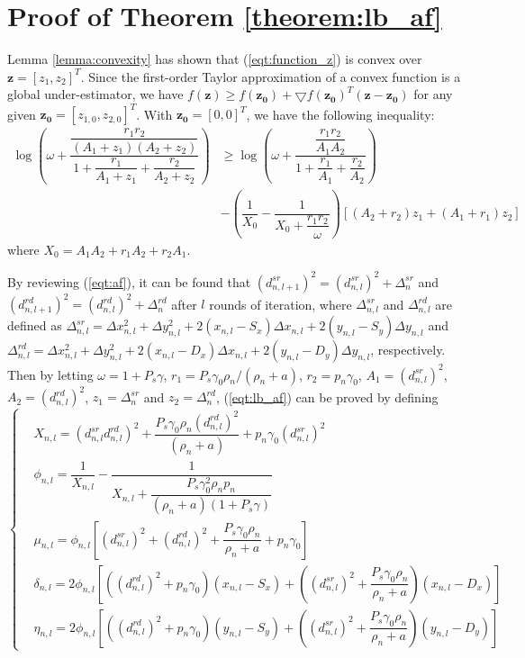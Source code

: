 \documentclass[12pt, draftclsnofoot, onecolumn]{IEEEtran}
\begin{document}
\section{Proof of Theorem \ref{theorem:lb_af}}\label{app:e}
Lemma \ref{lemma:convexity} has shown that (\ref{eqt:function_z}) is convex over $\bm{z}=[z_{1},z_{2}]^{T}$. Since the first-order Taylor approximation of a convex function is a global under-estimator\cite{Boyd:2004:CO:993483}, we have $f(\bm{z})\geq f(\bm{z}_{\bm{0}})+\bigtriangledown f(\bm{z}_{\bm{0}})^{T}(\bm{z}-\bm{z}_{\bm{0}})$ for any given $\bm{z}_{\bm{0}}=[z_{1,0},z_{2,0}]^{T}$. With $\bm{z}_{\bm{0}}=[0,0]^{T}$, we have the following inequality:
\begin{equation}
\begin{aligned}
\log(\omega +\dfrac{\dfrac{r_{1}r_{2}}{(A_{1}+z_{1})(A_{2}+z_{2})}}{1+\dfrac{r_{1}}{A_{1}+z_{1}}+\dfrac{r_{2}}{A_{2}+z_{2}}})&\geq \log(\omega +\dfrac{\dfrac{r_{1}r_{2}}{A_{1}A_{2}}}{1+\dfrac{r_{1}}{A_{1}}+\dfrac{r_{2}}{A_{2}}})\\
&-(\dfrac{1}{X_{0}}-\dfrac{1}{X_{0}+\dfrac{r_{1}r_{2}}{\omega}})[(A_{2}+r_{2})z_{1}+(A_{1}+r_{1})z_{2}]
\end{aligned}
\end{equation}
where $X_{0}=A_{1}A_{2}+r_{1}A_{2}+r_{2}A_{1}$.

By reviewing (\ref{eqt:af}), it can be found that $(d^{sr}_{n,l+1})^{2}=(d^{sr}_{n,l})^{2}+\Delta^{sr}_{n}$ and $(d^{rd}_{n,l+1})^{2}=(d^{rd}_{n,l})^{2}+\Delta^{rd}_{n}$ after $l$ rounds of iteration, where $\Delta^{sr}_{n,l}$ and $\Delta^{rd}_{n,l}$ are defined as $\Delta^{sr}_{n,l}=\Delta x_{n,l}^{2}+\Delta y_{n,l}^{2}+2(x_{n,l}-S_{x})\Delta x_{n,l}+2(y_{n,l}-S_{y})\Delta y_{n,l}$ and $\Delta^{rd}_{n,l}=\Delta x_{n,l}^{2}+\Delta y_{n,l}^{2}+2(x_{n,l}-D_{x})\Delta x_{n,l}+2(y_{n,l}-D_{y})\Delta y_{n,l}$, respectively. Then by letting $\omega=1+P_{s}\gamma$, $r_{1}=P_{s}\gamma_{0}\rho_{n}/(\rho_{n}+a)$, $r_{2}=p_{n}\gamma_{0}$, $A_{1}=(d^{sr}_{n,l})^{2}$, $A_{2}=(d^{rd}_{n,l})^{2}$, $z_{1}=\Delta^{sr}_{n}$ and $z_{2}=\Delta^{rd}_{n}$, (\ref{eqt:lb_af}) can be proved by defining
\begin{equation}\label{eqt:def}
\left\{
\begin{aligned}
&X_{n,l}=(d^{sr}_{n,l}d^{rd}_{n,l})^{2}+\dfrac{P_{s}\gamma_{0}\rho_{n}(d^{rd}_{n,l})^{2}}{(\rho_{n}+a)}+p_{n}\gamma_{0}(d^{sr}_{n,l})^{2}\\
&\phi_{n,l}=\dfrac{1}{X_{n,l}}-\dfrac{1}{X_{n,l}+\dfrac{P_{s}\gamma_{0}^{2}\rho_{n}p_{n}}{(\rho_{n}+a)(1+P_{s}\gamma)}}\\
&\mu_{n,l}=\phi_{n,l}[(d^{sr}_{n,l})^{2}+(d^{rd}_{n,l})^{2}+\dfrac{P_{s}\gamma_{0}\rho_{n}}{\rho_{n}+a}+p_{n}\gamma_{0}]\\
&\delta_{n,l}=2\phi_{n,l}[((d^{rd}_{n,l})^{2}+p_{n}\gamma_{0})(x_{n,l}-S_{x})+((d^{sr}_{n,l})^{2}+\dfrac{P_{s}\gamma_{0}\rho_{n}}{\rho_{n}+a})(x_{n,l}-D_{x})]\\
&\eta_{n,l}=2\phi_{n,l}[((d^{rd}_{n,l})^{2}+p_{n}\gamma_{0})(y_{n,l}-S_{y})+((d^{sr}_{n,l})^{2}+\dfrac{P_{s}\gamma_{0}\rho_{n}}{\rho_{n}+a})(y_{n,l}-D_{y})]
\end{aligned}
\right.
\end{equation}
\end{document}

